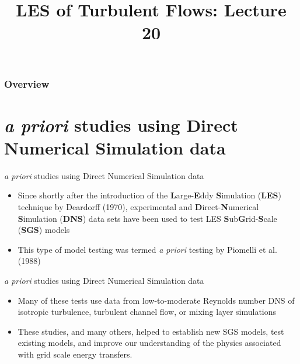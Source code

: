  
\title{LES of Turbulent Flows: Lecture 20}



\begin{frame} 
  \titlepage
\end{frame}


\begin{frame}
\frametitle{Overview}
\tableofcontents
\end{frame}

\section{ {\it a priori} studies using Direct Numerical Simulation data} %
\begin{frame}{ \textit{a priori} studies using Direct Numerical Simulation data}
\begin{itemize}
	\item Since shortly after the introduction of the {\bf L}arge-{\bf E}ddy {\bf S}imulation ({\bf LES}) technique by Deardorff (1970), experimental and {\bf D}irect-{\bf N}umerical {\bf S}imulation ({\bf DNS}) data sets have been used to test LES {\bf S}ub{\bf G}rid-{\bf S}cale ({\bf SGS}) models
	\item This type of model testing was termed {\it a priori} testing by Piomelli et al. (1988)
\end{itemize}
\end{frame}

\begin{frame}{\textit{a priori} studies using Direct Numerical Simulation data}
\begin{itemize}
	\item Many of these tests use data from low-to-moderate Reynolds number DNS of isotropic turbulence, turbulent channel flow, or mixing layer simulations
	\item These studies, and many others, helped to establish new SGS models, test existing models, and improve our understanding of the physics associated with grid scale energy transfers. 
\end{itemize}
\end{frame}

